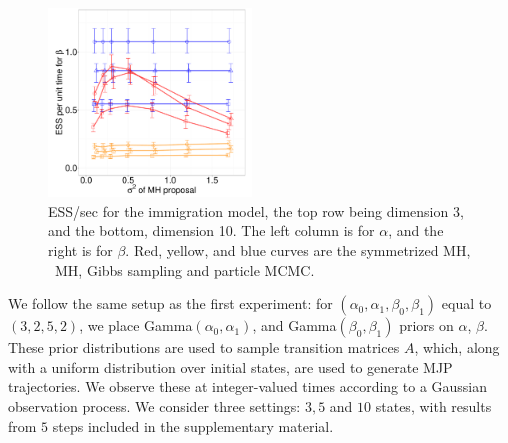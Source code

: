 {\begin{figure}
\begin{minipage}[hp]{0.82\linewidth}
    \includegraphics [width=0.48\textwidth, angle=0]{figures_new_apr12/Q_beta_dim10_18apr12.pdf}
  \end{minipage}
  \begin{minipage}[!hp]{0.17\linewidth}
    \caption{ESS/sec for the immigration model, the top row being dimension 3, and the bottom,
      dimension 10. The left column is for $\alpha$, and the 
    right is for $\beta$. Red, yellow, and blue curves are the symmetrized MH,
  \naive\ MH, Gibbs sampling and particle MCMC.}
     \label{fig:ESS_Q_D10}
  \end{minipage}
  \end{figure}
We follow the same setup as the first experiment:
for $(\alpha_0,\alpha_1,\beta_0,\beta_1)$ equal to $(3,2,5,2)$,
we place Gamma$(\alpha_0,\alpha_1)$, and Gamma$(\beta_0, \beta_1)$ priors on 
$\alpha$, $\beta$. These prior distributions are used to sample transition 
matrices $A$, which, along with a uniform distribution over initial states,
are used to generate MJP trajectories. We observe these at integer-valued
times according to a Gaussian observation process.
We consider three settings: $3, 5$ and $10$ states, with results from $5$ 
steps included in the supplementary material. 

}
